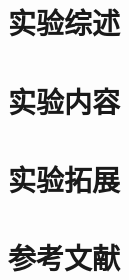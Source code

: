 \documentclass{physicsLab}
\begin{document}
	\section{实验综述}
	\section{实验内容}
	\section{实验拓展}
	\section{参考文献}
\end{document}
